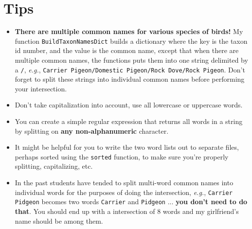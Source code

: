 \documentclass[11pt]{amsart}
\begin{document}
\section*{Tips}
\begin{itemize}
  \item \textbf{There are multiple common names for various species of birds!} My function \texttt{BuildTaxonNamesDict} builds a dictionary where the key is the taxon id number, and the value is the common name, except that when there are multiple common names, the functions puts them into one string delimited by a \texttt{/}, \textit{e.g.}, \texttt{Carrier Pigeon/Domestic Pigeon/Rock Dove/Rock Pigeon}. Don't forget to split these strings into individual common names before performing your intersection.
  \item Don't take capitalization into account, use all lowercase or uppercase words.
  \item You can create a simple regular expression that returns all words in a string by splitting on \textbf{any non-alphanumeric} character.
  \item It might be helpful for you to write the two word lists out to separate files, perhaps sorted using the \texttt{sorted} function, to make sure you're properly splitting, capitalizing, etc.
  \item In the past students have tended to split multi-word common names into individual words for the purposes of doing the intersection, \textit{e.g.}, \texttt{Carrier Pidgeon} becomes two words \texttt{Carrier} and \texttt{Pidgeon} ... \textbf{you don't need to do that}. You should end up with a intersection of 8 words and my girlfriend's name should be among them.
\end{itemize}
\end{document}
